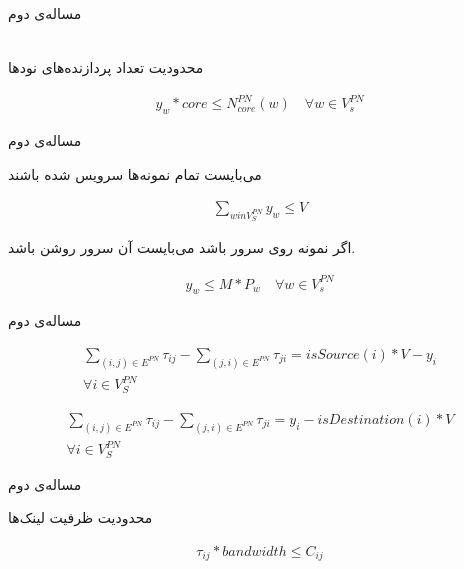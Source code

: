 \documentclass{beamer}
\begin{document}
\begin{persian}
\begin{frame}{مساله‌ی دوم}
\begin{latin}
\begin{align}
		\end{align}\end{latin}
	\par
	محدودیت تعداد پردازنده‌های نودها
	\begin{latin}\begin{align}
		y_{w} * core \le N_{core}^{PN}(w)
		\quad
		\forall w \in V_s^{PN}
	\end{align}\end{latin}
\end{frame}
\begin{frame}{مساله‌ی دوم}
	\par
	می‌بایست تمام نمونه‌ها سرویس شده باشند
	\begin{latin}\begin{align}
		\sum_{w in V_{S}^{PN}} y_w \le V
	\end{align}\end{latin}
	\par
	اگر نمونه روی سرور  باشد می‌بایست آن سرور روشن باشد.
	\begin{latin}\begin{align}
		y_w \le M * P_w
		\quad
		\forall w \in V_{s}^{PN}
	\end{align}\end{latin}
\end{frame}
\begin{frame}{مساله‌ی دوم}
	\par
	\begin{latin}\begin{align}
		\sum_{(i,j) \in E^{PN}} \tau_{ij} - \sum_{(j,i) \in E^{PN}} \tau_{ji} = isSource(i) * V - y_i \nonumber \\
		\forall i \in V_{S}^{PN}
	\end{align}\end{latin}
	\begin{latin}\begin{align}
		\sum_{(i,j) \in E^{PN}} \tau_{ij} - \sum_{(j,i) \in E^{PN}} \tau_{ji} = y_i - isDestination(i) * V \nonumber \\
		\forall i \in V_{S}^{PN}
	\end{align}\end{latin}
\end{frame}
\begin{frame}{مساله‌ی دوم}
	\par
	محدودیت ظرفیت لینک‌ها	
	\begin{latin}\begin{align}
		\tau_{ij} * bandwidth \le C_{ij}
	\end{align}\end{latin}

\end{frame}
\end{persian}
\end{document}
